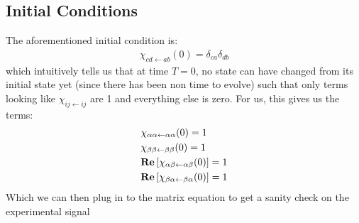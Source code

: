 \subsection{Initial Conditions}
The aforementioned initial condition is:
\begin{align}
	\chi_{cd\leftarrow ab}(0) = \delta_{ca} \delta_{db}
\end{align}
which intuitively tells us that at time $T=0$, no state can have changed from its initial state yet (since there has been non time to evolve) such that only terms looking like $\chi_{ij\leftarrow ij}$ are 1 and everything else is zero.  For us, this gives us the terms:
\begin{align*}
	&\chi_{\alpha \alpha \leftarrow \alpha \alpha} (0) = 1 \\
	&\chi_{\beta \beta \leftarrow \beta \beta} (0) = 1 \\
	&\textbf{Re} \left[  \chi_{\alpha \beta \leftarrow \alpha \beta} (0)  \right] = 1 \\
	&\textbf{Re} \left[  \chi_{\beta \alpha \leftarrow \beta \alpha} (0)  \right] = 1
\end{align*}
Which we can then plug in to the matrix equation to get a sanity check on the experimental signal
